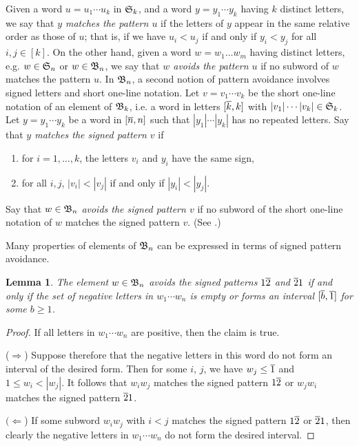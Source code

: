 \documentclass[11pt]{article}
\newtheorem{lem}[theo]{Lemma}
\theoremstyle{definition}
\numberwithin{equation}{section}
\begin{document}
Given a word $u = u_1 \cdots u_k$ in $\mathfrak{S}_{k}$,
and a word $y = y_1 \cdots y_k$ having $k$ distinct letters,
we say that {\em $y$ matches the pattern $u$} if the letters of $y$ appear
in the same relative order as those of $u$; that is, if we have
$u_i < u_j$ if and only if $y_i < y_j$ for all $i,j \in [k]$.
On the other hand, given a word $w = w_1\dotsc w_m$ having distinct letters,
e.g. $w \in \mathfrak{S}_{n}$ or $w \in \mathfrak{B}_n$,
we say that {\em $w$ avoids the pattern $u$} if no subword
of $w$ matches the pattern $u$.
In $\mathfrak{B}_n$, a second notion of pattern avoidance
involves signed letters and short one-line notation.
Let $v = v_1 \cdots v_k$ be the short one-line notation of
an element of $\mathfrak{B}_{k}$,
i.e. a word in
letters $[\overline{k}, k]$ with
$|v_1| \cdots |v_k| \in \mathfrak{S}_{k}$.
Let $y = y_1 \cdots y_k$ be a word in $[\overline{n}, n]$ such that
$|y_1| \cdots |y_k|$ has no repeated letters.
Say that {\em $y$ matches the signed pattern $v$} if
\begin{enumerate}
\item for $i = 1,\dotsc, k$, the letters $v_i$ and $y_i$ have the same sign,
\item for all $i, j$, $|v_i| < |v_j|$ if and only if $|y_i| < |y_j|$.
\end{enumerate}
Say that $w \in \mathfrak{B}_n$ {\em avoids the signed pattern $v$} if no subword of
the short one-line notation of $w$ matches the signed pattern $v$.
(See \cite[p.\,108]{BilleyLak}.)

Many properties of elements of $\mathfrak{B}_n$ can be expressed in terms of
signed pattern avoidance.
\begin{lem}\label{l:1ol2ol21}
  The element $w \in \mathfrak{B}_n$ avoids the signed patterns $1\overline{2}$ and $\overline{2}1$
  if and only if
  the set of negative letters in $w_1 \cdots w_n$ is empty or
  forms an interval $[\overline{b}, \overline{1}]$ for some $b \geq 1$.
\end{lem}
\begin{proof}
  If all letters in $w_1 \cdots w_n$ are positive, then the claim is true.

  ($\Rightarrow$)
  Suppose therefore that the negative letters in this word do not form
  an interval of the desired form. Then for some $i$, $j$, we have
  $w_j \leq \overline{1}$ and $1 \leq w_i < |w_j|$.
  It follows that $w_iw_j$ matches the signed
  pattern $1\overline{2}$ or $w_jw_i$ matches the signed pattern $\overline{2} 1$.

  $(\Leftarrow$)
  If some subword $w_iw_j$ with $i < j$ matches the signed pattern
  $1 \overline{2}$ or $\overline{2}1$, then clearly the negative letters in $w_1 \cdots w_n$
  do not form the desired interval.
\end{proof}
\end{document}
